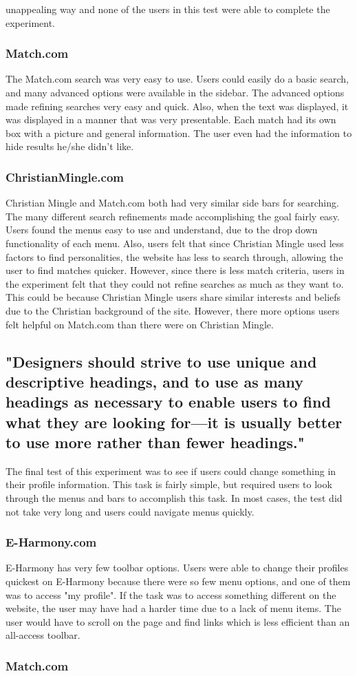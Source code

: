 \documentclass{article}
\begin{document}
 unappealing way and none of the users in this test were able to complete the experiment. 

\subsubsection{Match.com}
The Match.com search was very easy to use. Users could easily do a basic search, and many advanced options were available in the sidebar. The advanced options made refining searches very easy and quick. Also, when the text was displayed, it was displayed in a manner that was very presentable. Each match had its own box with a picture and general information. The user even had the information to hide results he/she didn't like. 

\subsubsection{ChristianMingle.com}
Christian Mingle and Match.com both had very similar side bars for searching. The many different search refinements made accomplishing the goal fairly easy. Users found the menus easy to use and understand, due to the drop down functionality of each menu. Also, users felt that since Christian Mingle used less factors to find personalities, the website has less to search through, allowing the user to find matches quicker. However, since there is less match criteria, users in the experiment felt that they could not refine searches as much as they want to. This could be because Christian Mingle users share similar interests and beliefs due to the Christian background of the site. However, there more options users felt helpful on Match.com than there were on Christian Mingle. 

\subsection{"Designers should strive to use unique and descriptive headings, and 
to use as many headings as necessary to enable users to find what 
they are looking for—it is usually better to use more rather than fewer 
headings."}

The final test of this experiment was to see if users could change something in their profile information. This task is fairly simple, but required users to look through the menus and bars to accomplish this task. In most cases, the test did not take very long and users could navigate menus quickly.

\subsubsection{E-Harmony.com}
E-Harmony has very few toolbar options. Users were able to change their profiles quickest on E-Harmony because there were so few menu options, and one of them was to access "my profile". If the task was to access something different on the website, the user may have had a harder time due to a lack of menu items. The user would have to scroll on the page and find links which is less efficient than an all-access toolbar.

\subsubsection{Match.com}

\pagebreak
%
%
\end{document}

